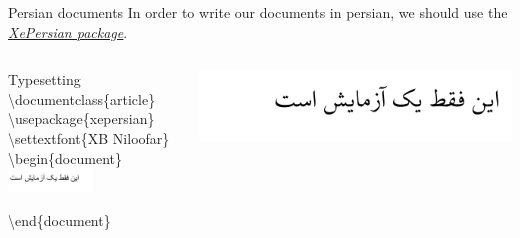 \documentclass[10pt,xcolor={dvipsnames}]{beamer}
\begin{document}
		\begin{frame}{Persian documents}
			\onslide<2->
			In order to write our documents in persian, we should use the 
			\href{http://ftp.lyx.org/pub/tex-archive/macros/xetex/latex/xepersian/xepersian.pdf}{\underline{\textit{XePersian package}}}. \\
			
			\begin{columns}[T]
				\begin{column}{0.5 \textwidth}
					\begin{block}{Typesetting}
						\textbackslash documentclass\{{\color{blue}article}\}\\
						\textbackslash usepackage\{{\color{orange}xepersian}\}\\
						{\color{orange} \textbackslash settextfont\{XB Niloofar\}}\\
						\textbackslash begin\{{\color{blue}document}\}\\
						
						\quad \includegraphics[width=0.5\textwidth]{Files/persian.pdf}
						
						\textbackslash end\{{\color{blue}document}\}
						
					\end{block}
				\end{column}
				
				\begin{column}{0.5 \textwidth}
					\vspace{1.5cm}
					\includegraphics[width=1\textwidth]{Images/persian2.png}
				\end{column}
			\end{columns}
		\end{frame}
	
\end{document}
